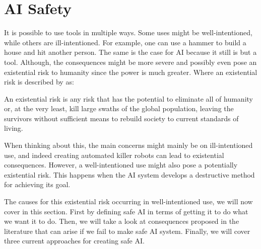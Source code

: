 \documentclass[12pt,A4]{report}
\theoremstyle{definition}
\begin{document}
\section{AI Safety}
It is possible to use tools in multiple ways. Some uses might be well-intentioned, while others are ill-intentioned. For example, one can use a hammer to build a house and hit another person. The same is the case for AI because it still is but a tool. Although, the consequences might be more severe and possibly even pose an existential risk to humanity since the power is much greater. Where an existential risk is described by \citet{FLI} as:
\begin{displayquote}
An existential risk is any risk that has the potential to eliminate all of humanity or, at the very least, kill large swaths of the global population, leaving the survivors without sufficient means to rebuild society to current standards of living.
\end{displayquote}

When thinking about this, the main concerns might mainly be on ill-intentioned use, and indeed creating automated killer robots can lead to existential consequences. However, a well-intentioned use might also pose a potentially existential risk. This happens when the AI system develops a destructive method for achieving its goal. 

The causes for this existential risk occurring in well-intentioned use, we will now cover in this section. First by defining safe AI in terms of getting it to do what we want it to do. Then, we will take a look at consequences proposed in the literature that can arise if we fail to make safe AI system. Finally, we will cover three current approaches for creating safe AI. 

\end{document}
